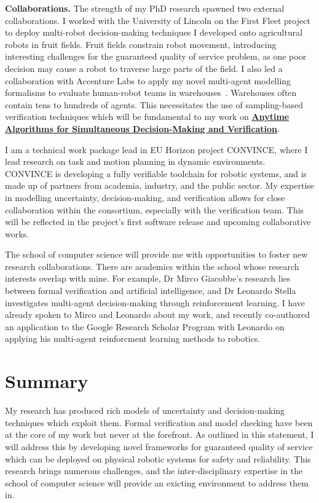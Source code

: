 \documentclass[12pt]{article}
\newcommand{\anytime}{\hyperlink{topicthree}{\textbf{Anytime Algorithms for Simultaneous Decision-Making and Verification}}}
\begin{document}
\vspace*{1ex}\noindent\textbf{Collaborations.} The strength of my PhD research spawned two external collaborations.
%
I worked with the University of Lincoln on the First Fleet project to deploy multi-robot decision-making techniques I developed onto agricultural robots in fruit fields.
%
Fruit fields constrain robot movement, introducing interesting challenges for the guaranteed quality of service problem, as one poor decision may cause a robot to traverse large parts of the field.
%
I also led a collaboration with Accenture Labs to apply my novel multi-agent modelling formalisms to evaluate human-robot teams in warehouses~\cite{street2022context,street2023analysing}.
%
Warehouses often contain tens to hundreds of agents.
%
This necessitates the use of sampling-based verification techniques which will be fundamental to my work on \anytime. 


I am a technical work package lead in EU Horizon project CONVINCE, where I lead research on task and motion planning in dynamic environments.
%
CONVINCE is developing a fully verifiable toolchain for robotic systems, and is made up of partners from academia, industry, and the public sector.
%
My expertise in modelling uncertainty, decision-making, and verification allows for close collaboration within the consortium, especially with the verification team.
%
This will be reflected in the project's first software release and upcoming collaborative works.

The school of computer science will provide me with opportunities to foster new research collaborations.
%
There are academics within the school whose research interests overlap with mine.
%
For example, Dr Mirco Giacobbe's research lies between formal verification and artificial intelligence, and Dr Leonardo Stella investigates multi-agent decision-making through reinforcement learning.
%
I have already spoken to Mirco and Leonardo about my work, and recently co-authored an application to the Google Research Scholar Program with Leonardo on applying his multi-agent reinforcment learning methods to robotics.


\section*{Summary}

My research has produced rich models of uncertainty and decision-making techniques which exploit them.
%
Formal verification and model checking have been at the core of my work but never at the forefront.
%
As outlined in this statement, I will address this by developing novel frameworks for guaranteed quality of service which can be deployed on physical robotic systems for safety and reliability.
%
This research brings numerous challenges, and the inter-disciplinary expertise in the school of computer science will provide an exicting environment to address them in.

\printbibliography
\end{document}
